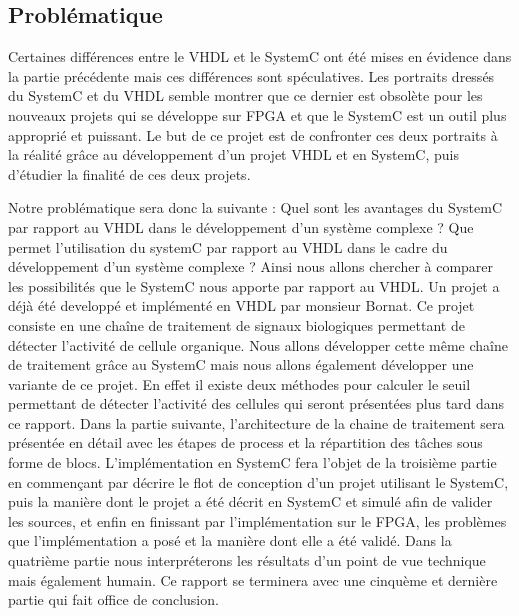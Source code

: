 \documentclass[a4paper,12pt]{article}
\begin{document}
\subsection{Problématique}

Certaines différences entre le VHDL et le SystemC ont été mises en évidence dans la partie précédente mais ces différences sont spéculatives. Les portraits dressés du SystemC et du VHDL semble montrer que ce dernier est obsolète pour les nouveaux projets qui se développe sur FPGA et que le SystemC est un outil plus approprié et puissant. Le but de ce projet est de confronter ces deux portraits à la réalité grâce au développement d'un projet VHDL et en SystemC, puis d'étudier la finalité de ces deux projets.\newline

Notre problématique sera donc la suivante : Quel sont les avantages du SystemC par rapport au VHDL dans le développement d'un système complexe ?  
Que permet l’utilisation du systemC par rapport au VHDL dans le cadre du développement d’un système complexe ? \newline
Ainsi nous allons chercher à comparer les possibilités que le SystemC nous apporte par rapport au VHDL. Un projet a déjà été developpé et implémenté en VHDL par monsieur Bornat. Ce projet consiste en une chaîne de traitement de signaux biologiques permettant de détecter l'activité de cellule organique. Nous allons développer cette même chaîne de traitement grâce au SystemC mais nous allons également développer une variante de ce projet. En effet il existe deux méthodes pour calculer le seuil permettant de détecter l'activité des cellules qui seront présentées plus tard dans ce rapport.\newline
Dans la partie suivante, l'architecture de la chaine de traitement sera présentée en détail avec les étapes de process et la répartition des tâches sous forme de blocs. L'implémentation en SystemC fera l'objet de la troisième partie en commençant par décrire le flot de conception d'un projet utilisant le SystemC, puis la manière dont le projet a été décrit en SystemC et simulé afin de valider les sources, et enfin en finissant par l'implémentation sur le FPGA, les problèmes que l'implémentation a posé et la manière dont elle a été validé. Dans la quatrième partie nous interpréterons les résultats d'un point de vue technique mais également humain. Ce rapport se terminera avec une cinquème et dernière partie qui fait office de conclusion.
\end{document}
